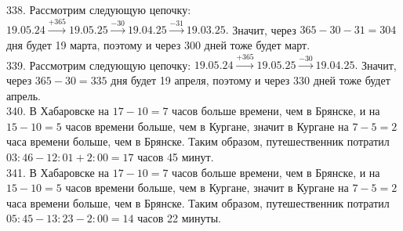 338. Рассмотрим следующую цепочку: $19.05.24\stackrel{+365}{\rightarrow}19.05.25\stackrel{-30}{\rightarrow}19.04.25
\stackrel{-31}{\rightarrow}19.03.25.$ Значит, через $365-30-31=304$ дня будет 19 марта, поэтому и через 300 дней тоже будет март.\\
339. Рассмотрим следующую цепочку: $19.05.24\stackrel{+365}{\rightarrow}19.05.25\stackrel{-30}{\rightarrow}19.04.25.$ Значит, через $365-30=335$ дня будет 19 апреля, поэтому и через 330 дней тоже будет апрель.\\
340. В Хабаровске на $17-10=7$ часов больше времени, чем в Брянске, и на $15-10=5$ часов времени больше, чем в Кургане, значит в Кургане на $7-5=2$ часа времени больше, чем в Брянске. Таким образом, путешественник потратил
$03:46-12:01+2:00=17$ часов 45 минут.\\
341. В Хабаровске на $17-10=7$ часов больше времени, чем в Брянске, и на $15-10=5$ часов времени больше, чем в Кургане, значит в Кургане на $7-5=2$ часа времени больше, чем в Брянске. Таким образом, путешественник потратил
$05:45-13:23-2:00=14$ часов 22 минуты.
\newpage
